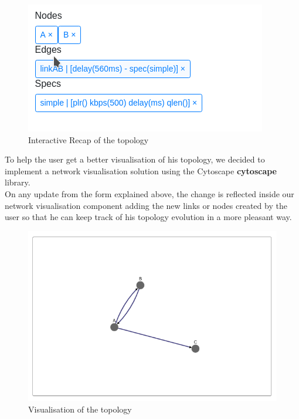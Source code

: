 \documentclass{eplmastersthesis}
\begin{document}
          \begin{figure}[H]
            \centering
            \includegraphics[scale=0.6]{figures/recap_topology.png}
            \caption{\label{recap_topology} Interactive Recap of the topology}
          \end{figure}

          To help the user get a better visualisation of his topology, we
          decided to implement a network visualisation solution using the
          Cytoscape \textbf{cytoscape} library.\\
          On any update from the form explained above, the change is reflected
          inside our network visualisation component adding the new links or
          nodes created by the user so that he can keep track of his topology
          evolution in a more pleasant way.\\

          \begin{figure}[H]
            \centering
            \includegraphics[scale=0.6]{figures/visual_topology.png}
            \caption{\label{visual_topology} Visualisation of the topology}
          \end{figure}
\end{document}
